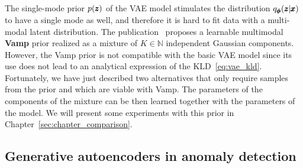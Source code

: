 The single-mode prior $p(\pmb{{z}})$ of the VAE model stimulates the distribution $q_{\pmb{{\phi}}}(\pmb{{z}}|\pmb{{x}})$ to have a single mode as well, and therefore it is hard to fit data with a multi-modal latent distribution. The publication~\cite{tomczak2018vae} proposes a learnable multimodal \textbf{Vamp} prior realized as a mixture of $K \in \mathbb{N}$ independent Gaussian components. However, the Vamp prior is not compatible with the basic VAE model since its use does not lead to an analytical expression of the KLD~\eqref{eq:vae_kld}. Fortunately, we have just described two alternatives that only require samples from the prior and which are viable with Vamp. The parameters of the components of the mixture can be then learned together with the parameters of the model. We will present some experiments with this prior in Chapter~\ref{sec:chapter_comparison}.

\subsection{Generative autoencoders in anomaly detection}
